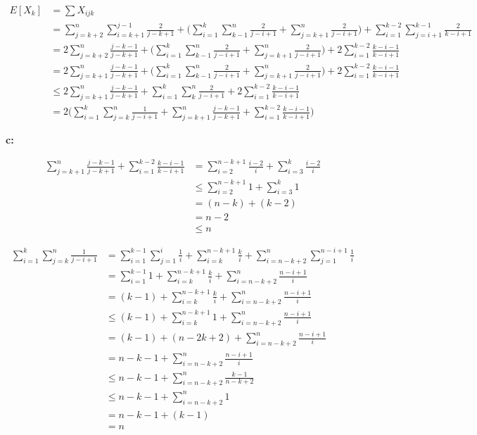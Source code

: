\documentclass{book}
\begin{document}
\begin{CJK}{UTF8}{gkai}
\begin{align*}
E[X_k] & = \sum X_{ijk} \\
& = \sum_{j=k+2}^{n}\sum_{i=k+1}^{j-1}\frac{2}{j-k+1} + 
\Big(\sum_{i=1}^{k}\sum_{k-1}^{n}\frac{2}{j-i+1} + 
\sum_{j=k+1}^{n}\frac{2}{j-i+1}\Big)
+\sum_{i=1}^{k-2}\sum_{j=i+1}^{k-1}\frac{2}{k-i+1} \\
& = 2\sum_{j=k+2}^{n}\frac{j-k-1}{j-k+1} + 
\Big(\sum_{i=1}^{k}\sum_{k-1}^{n}\frac{2}{j-i+1} + 
\sum_{j=k+1}^{n}\frac{2}{j-i+1}\Big)
+ 
2\sum_{i=1}^{k-2}\frac{k-i-1}{k-i+1}\\
& = 2\sum_{j=k+1}^{n}\frac{j-k-1}{j-k+1} + 
\Big(\sum_{i=1}^{k}\sum_{k-1}^{n}\frac{2}{j-i+1} + 
\sum_{j=k+1}^{n}\frac{2}{j-i+1}\Big) + 2\sum_{i=1}^{k-2}\frac{k-i-1}{k-i+1}\\
& \le 2\sum_{j=k+1}^{n}\frac{j-k-1}{j-k+1} + 
\sum_{i=1}^{k}\sum_{k}^{n}\frac{2}{j-i+1} + 2\sum_{i=1}^{k-2}\frac{k-i-1}{k-i+1} 
\\
& = 2\Big(\sum_{i=1}^{k}\sum_{j=k}^{n}\frac{1}{j-i+1} + 
\sum_{j=k+1}^{n}\frac{j-k-1}{j-k+1} + \sum_{i=1}^{k-2}\frac{k-i-1}{k-i+1}\Big)
\end{align*}

\textbf{c:}

\begin{align*}
\sum_{j=k+1}^{n}\frac{j-k-1}{j-k+1} + \sum_{i=1}^{k-2}\frac{k-i-1}{k-i+1} & = 
\sum_{i=2}^{n-k+1}\frac{i-2}{i} + \sum_{i=3}^{k}\frac{i-2}{i} \\
& \le \sum_{i=2}^{n-k+1}1 + \sum_{i=3}^{k}1 \\
& = (n-k) + (k-2) \\
& = n-2 \\
& \le n
\end{align*}

\begin{align*}
\sum_{i=1}^{k}\sum_{j=k}^{n}\frac{1}{j-i+1} & = 
\sum_{i=1}^{k-1}\sum_{j=1}^{i}\frac{1}{i} + \sum_{i=k}^{n-k+1}\frac{k}{i} + 
\sum_{i=n-k+2}^{n}\sum_{j=1}^{n-i+1}\frac{1}{i} \\
& = \sum_{i=1}^{k-1}1 + \sum_{i=k}^{n-k+1}\frac{k}{i} + 
\sum_{i=n-k+2}^{n}\frac{n-i+1}{i} \\
& = (k-1) + \sum_{i=k}^{n-k+1}\frac{k}{i} + \sum_{i=n-k+2}^{n}\frac{n-i+1}{i} \\
& \le (k-1) + \sum_{i=k}^{n-k+1}1 + \sum_{i=n-k+2}^{n}\frac{n-i+1}{i} \\
& = (k-1) + (n-2k+2) + \sum_{i=n-k+2}^{n}\frac{n-i+1}{i} \\
& = n-k-1 + \sum_{i=n-k+2}^{n}\frac{n-i+1}{i} \\
& \le n-k-1 + \sum_{i=n-k+2}^{n}\frac{k-1}{n-k+2} \\
& \le n-k-1 + \sum_{i=n-k+2}^{n}1 \\
& = n-k-1 + (k-1) \\
& = n
\end{align*}


\end{CJK}
\end{document}
